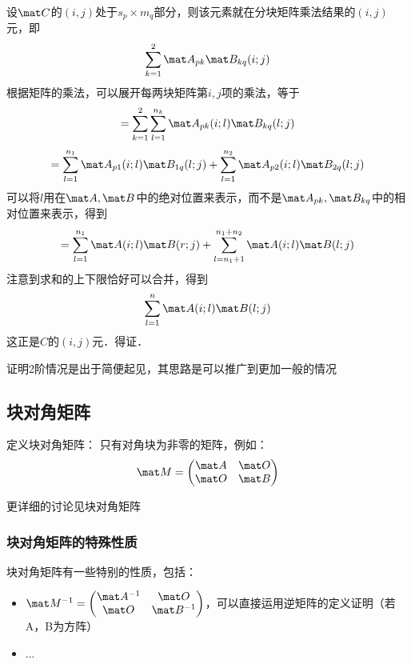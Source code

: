 设$\mat C$的$(i,j)$处于$s_p\times{m_q}$部分，则该元素就在分块矩阵乘法结果的$(i,j)$元，即
\[\sum_{k=1}^{2}\mat A_{pk}\mat B_{kq}(i;j)\]
根据矩阵的乘法，可以展开每两块矩阵第$i,j$项的乘法，等于
\[=\sum_{k=1}^{2}\sum_{l=1}^{n_k}\mat A_{pk}(i;l)\mat B_{kq}(l;j)\]
\[=\sum_{l=1}^{n_1}\mat A_{p1}(i;l)\mat B_{1q}(l;j)+\sum_{l=1}^{n_2}\mat A_{p2}(i;l)\mat B_{2q}(l;j)\]
可以将$l$用在$\mat A,\mat B$中的绝对位置来表示，而不是$\mat A_{pk},\mat B_{kq}$中的相对位置来表示，得到
\[=\sum_{l=1}^{n_1}\mat A(i;l)\mat B(r;j)+\sum_{l=n_1+1}^{n_1+n_2}\mat A(i;l)\mat B(l;j)\]
注意到求和的上下限恰好可以合并，得到
\[\sum_{l=1}^{n}\mat A(i;l)\mat B(l;j)\]
这正是$C$的$(i,j)$元．得证．

证明2阶情况是出于简便起见，其思路是可以推广到更加一般的情况

\subsection{块对角矩阵}
定义块对角矩阵： 只有对角块为非零的矩阵，例如：
\begin{equation}
\mat M = 
\begin{pmatrix}
\mat A & \mat O\\
\mat O & \mat B\\
\end{pmatrix}
\end{equation}

更详细的讨论见块对角矩阵


\subsubsection{块对角矩阵的特殊性质}
块对角矩阵有一些特别的性质，包括：
\begin{itemize}
\item $\mat M ^ {-1} = 
\begin{pmatrix}
\mat A^{-1} & \mat O\\
\mat O & \mat B^{-1}\\
\end{pmatrix}
$，可以直接运用逆矩阵的定义证明（若A，B为方阵）
\item ...
\end{itemize}




